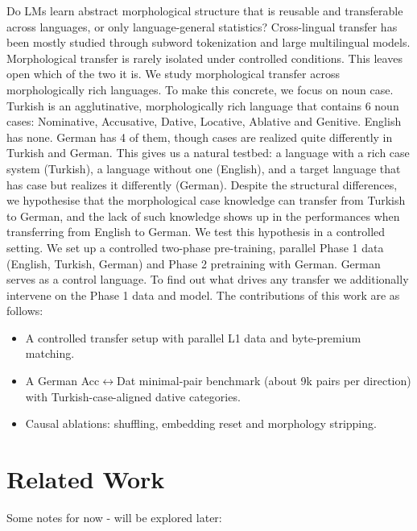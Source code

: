 \documentclass[11pt]{article}
\begin{document}
  
Do LMs learn abstract morphological structure that is reusable and transferable across languages, or only language-general statistics? 
Cross-lingual transfer has been mostly studied through subword tokenization and large multilingual models. Morphological transfer is rarely isolated under controlled conditions. 
This leaves open which of the two it is.
We study morphological transfer across morphologically rich languages.
To make this concrete, we focus on noun case.
Turkish is an agglutinative, morphologically rich language that contains 6 noun cases: Nominative, Accusative, Dative, Locative, Ablative and Genitive. 
English has none. German has 4 of them, though cases are realized quite differently in Turkish and German. 
This gives us a natural testbed: a language with a rich case system (Turkish), a language without one (English), and a target language that has case but realizes it differently (German).
Despite the structural differences, we hypothesise that the morphological case knowledge can transfer from Turkish to German, 
and the lack of such knowledge shows up in the performances when transferring from English to German.
We test this hypothesis in a controlled setting.
We set up a controlled two-phase pre-training, parallel Phase 1 data (English, Turkish, German) and Phase 2 pretraining with German. 
German serves as a control language. To find out what drives any transfer we additionally intervene on the Phase 1 data and model.
The contributions of this work are as follows:
\begin{itemize}
    \item A controlled transfer setup with parallel L1 data and byte-premium matching.
    \item A German Acc$\leftrightarrow$Dat minimal-pair benchmark (about 9k pairs per direction) with Turkish-case-aligned dative categories.
    \item Causal ablations: shuffling, embedding reset and morphology stripping.
\end{itemize}

\section{Related Work}


Some notes for now - will be explored later:
\end{document}
